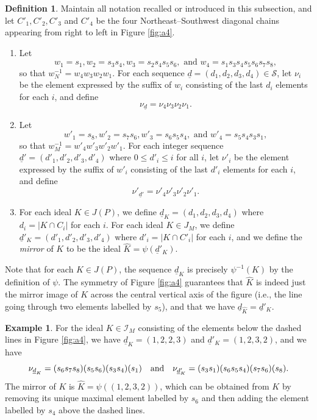 \documentclass[11pt]{amsart}
\theoremstyle{plain}
\theoremstyle{definition}
\newtheorem{defn}[theorem]{Definition}
\newtheorem{exa}[theorem]{Example}
\theoremstyle{remark}
\numberwithin{equation}{section}
\newcommand{\wnn}{w_{N}}
\newcommand{\seqd}{\underline{d}}
\newcommand{\cali}{\mathcal{I}}
\newcommand{\cals}{\mathcal{S}}
\newcommand{\inverse}{^{-1}}
\newcommand{\abs}[1]{\lvert #1 \rvert}
\begin{document}
\begin{defn}
\label{defn:seq_to_word}
Maintain all notation recalled or introduced in this subsection, and let $C'_1,
C'_2, C'_3$ and $C'_4$ be the four Northeast--Southwest diagonal
  chains appearing from right to left in Figure \ref{fig:a4}.
\begin{enumerate}
\item 
Let 
\[
  w_1=s_1, w_2=s_3s_4,
w_3=s_2s_4s_5s_6, \text{ and }w_4=s_1s_3s_4s_5s_6s_7s_8,\]
so that $\wnn\inverse=w_4w_3w_2w_1$.
For each sequence $\seqd=(d_1,d_2,d_3,d_4)\in \cals$,
let $\nu_i$ be the element
expressed by the suffix of $w_i$ consisting of the last $d_i$ elements for each
$i$, and
define
\[
  \nu_{\seqd}=\nu_4\nu_3\nu_2\nu_1.
\]
\item Let 
  \[
  w'_1=s_8, w'_2=s_7s_6, w'_3=s_6s_5s_4, \text{ and } w'_4=s_5s_4s_3s_1,
  \]
  so that $w_M\inverse = w'_4w'_3w'_2w'_1$.  
For each integer sequence $\seqd'=(d'_1,d'_2,d'_3,d'_4)$ where $0\le d'_i\le i$ for all
$i$, let $\nu'_i$ be the 
element expressed by the suffix of $w'_i$ consisting of the last $d'_i$ elements for
each $i$, and
define
\[
  \nu'_{\seqd'}=\nu'_4\nu'_3\nu'_2\nu'_1.
\]
\item For each ideal $K\in J(P)$, we define $\seqd_K=(d_1,d_2,d_3,d_4)$ where
  $d_i=\abs{K\cap C_i}$ for each $i$. For each ideal $K\in J_M$, we define
  $\seqd'_K=(d'_1,d'_2,d'_3, d'_4)$ where $d'_i=\abs{K\cap C'_i}$ for each $i$,
  and we define the \emph{mirror} of $K$ to be the ideal $\hat K=\psi(\seqd'_K)$.
\end{enumerate} \end{defn}

Note that for each $K\in J(P)$, the sequence $\seqd_K$ is precisely
$\psi\inverse(K)$ by the definition of $\psi$. The symmetry of Figure
\ref{fig:a4} guarantees that $\hat K$ is indeed just the mirror image of $K$
across the central vertical axis of the figure (i.e., the line going through two
elements labelled by $s_5$), and that we have $\seqd_{\hat K}=\seqd'_K$. 

\begin{exa}
\label{exa:dd'}
For the ideal $K\in \cali_M$ consisting of the elements below the dashed lines in
Figure \ref{fig:a4}, we have $\seqd_K=(1,2,2,3)$ and $\seqd'_K=(1,2,3,2)$, and we have
\[
  \nu_{\seqd_K}=(s_6s_7s_8)(s_5s_6)(s_3s_4)(s_1)\text{\quad and\quad}
  \nu_{\seqd'_K}=(s_3s_1)(s_6s_5s_4)(s_7s_6)(s_8).
\]
The mirror
of $K$ is $\hat K=\psi((1,2,3,2))$, which can be obtained from $K$ by removing
its unique maximal element labelled by $s_6$ and then adding the element
labelled by $s_4$ above the dashed lines.
\end{exa}
\end{document}
